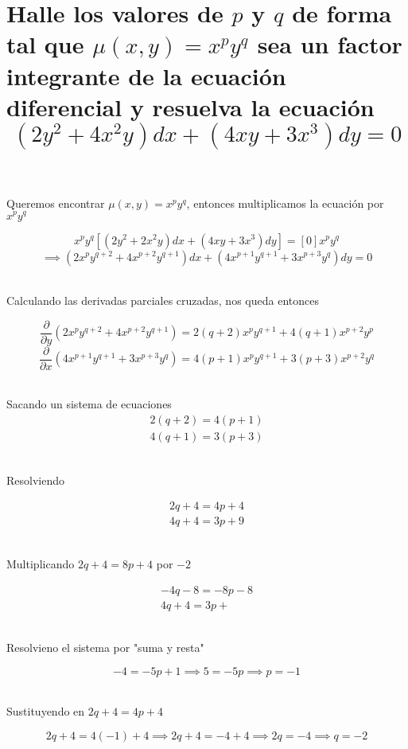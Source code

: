 \section{Halle los valores de $p$ y $q$ de forma tal que $\mu (x,y) = x^p y^q$ sea un factor integrante de la ecuación diferencial y resuelva la ecuación $$(2y^2 + 4x^2 y)dx + (4xy + 3x^3)dy = 0$$}
\\
\\Queremos encontrar $\mu (x,y) = x^p y^q$, entonces multiplicamos la ecuación por $x^p y^q$

$$x^p y^q\left[ (2y^2 + 2x^2y)dx + (4xy + 3x^3)dy \right] = \left[0 \right]x^p y^q$$
$$\implies (2x^p y^{q+2} + 4x^{p+2}y^{q+1})dx + (4x^{p+1}y^{q+1} + 3x^{p+3}y^q)dy = 0$$

\\ Calculando las derivadas parciales cruzadas, nos queda entonces

$$\frac{\partial}{\partial y} \left(2x^p y^{q+2} + 4x^{p+2}y^{q+1}\right) = 2\left( q+2 \right)x^p y^{q+1} + 4\left( q+1 \right)x^{p+2}y^p$$
$$\frac{\partial}{\partial x} \left(4x^{p+1}y^{q+1} + 3x^{p+3}y^q\right) = 4\left( p+1 \right)x^p y^{q+1} + 3\left( p+3 \right)x^{p+2}y^q$$

\\Sacando un sistema de ecuaciones 
\begin{align*}
    2(q+2) = 4(p+1) \\
    4(q+1) = 3(p+3)
\end{align*}

\\Resolviendo

\begin{align*}
    2q + 4 = 4p + 4 \\
    4q + 4 = 3p + 9
\end{align*} 

\\Multiplicando $2q + 4 = 8p + 4$ por $-2$

\begin{align*}
    -4q - 8 = -8p - 8\\
    4q + 4 = 3p + 
\end{align*}

\\Resolvieno el sistema por "suma y resta"

$$-4 = -5p + 1 \implies 5 = -5p \implies p = -1$$

\\Sustituyendo en $2q + 4 = 4p + 4$

$$2q + 4 = 4(-1) + 4 \implies 2q + 4 = -4 + 4 \implies 2q = -4 \implies q = -2$$

